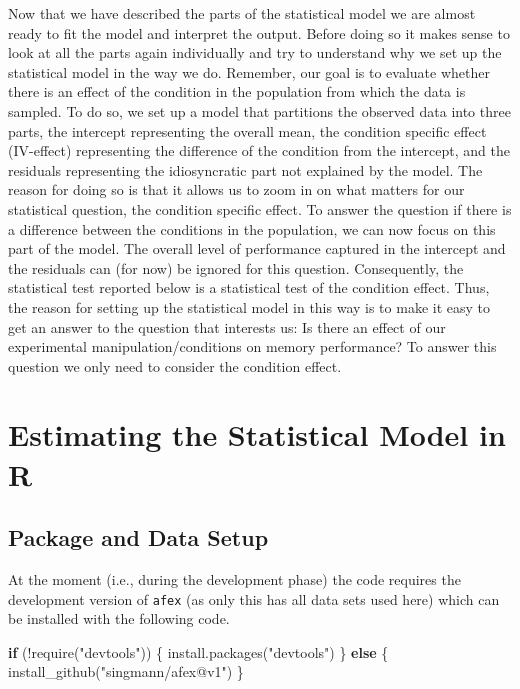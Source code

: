 \documentclass[
]{book}
\newenvironment{Shaded}{\begin{snugshade}}{\end{snugshade}}
\newcommand{\ControlFlowTok}[1]{\textcolor[rgb]{0.13,0.29,0.53}{\textbf{#1}}}
\newcommand{\FunctionTok}[1]{\textcolor[rgb]{0.00,0.00,0.00}{#1}}
\newcommand{\NormalTok}[1]{#1}
\newcommand{\SpecialCharTok}[1]{\textcolor[rgb]{0.00,0.00,0.00}{#1}}
\newcommand{\StringTok}[1]{\textcolor[rgb]{0.31,0.60,0.02}{#1}}
\begin{document}
Now that we have described the parts of the statistical model we are almost ready to fit the model and interpret the output. Before doing so it makes sense to look at all the parts again individually and try to understand why we set up the statistical model in the way we do. Remember, our goal is to evaluate whether there is an effect of the condition in the population from which the data is sampled. To do so, we set up a model that partitions the observed data into three parts, the intercept representing the overall mean, the condition specific effect (IV-effect) representing the difference of the condition from the intercept, and the residuals representing the idiosyncratic part not explained by the model. The reason for doing so is that it allows us to zoom in on what matters for our statistical question, the condition specific effect. To answer the question if there is a difference between the conditions in the population, we can now focus on this part of the model. The overall level of performance captured in the intercept and the residuals can (for now) be ignored for this question. Consequently, the statistical test reported below is a statistical test of the condition effect. Thus, the reason for setting up the statistical model in this way is to make it easy to get an answer to the question that interests us: Is there an effect of our experimental manipulation/conditions on memory performance? To answer this question we only need to consider the condition effect.

\hypertarget{estimating-the-statistical-model-in-r}{%
\section{Estimating the Statistical Model in R}\label{estimating-the-statistical-model-in-r}}

\hypertarget{package-and-data-setup}{%
\subsection{Package and Data Setup}\label{package-and-data-setup}}

At the moment (i.e., during the development phase) the code requires the development version of \texttt{afex} (as only this has all data sets used here) which can be installed with the following code.

\begin{Shaded}
\begin{Highlighting}[]
\ControlFlowTok{if}\NormalTok{ (}\SpecialCharTok{!}\FunctionTok{require}\NormalTok{(}\StringTok{"devtools"}\NormalTok{)) \{}
  \FunctionTok{install.packages}\NormalTok{(}\StringTok{"devtools"}\NormalTok{)}
\NormalTok{\} }\ControlFlowTok{else}\NormalTok{ \{}
  \FunctionTok{install\_github}\NormalTok{(}\StringTok{"singmann/afex@v1"}\NormalTok{)}
\NormalTok{\}}
\end{Highlighting}
\end{Shaded}
\end{document}
